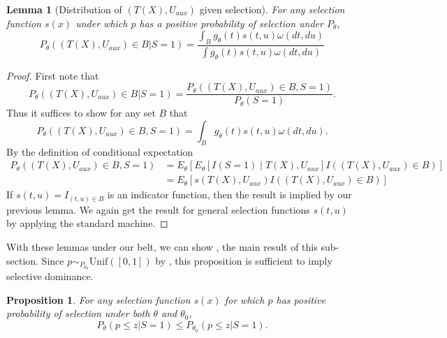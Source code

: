 \documentclass{article}
\newtheorem{lemma}{Lemma}
\newtheorem{proposition}{Proposition}
\begin{document}
\begin{appendix}
\begin{lemma}[Distribution of $(T(X), U_{aux})$ given selection]
    \label{lem:cond_dist}
    For any selection function $s(x)$ under which $p$ has a positive probability of selection under $P_{\theta}$, 
    \begin{equation*}
        P_{\theta}((T(X), U_{aux}) \in B| S = 1 ) = \frac{\int_{B} g_{\theta}(t)s(t, u) \omega(dt, du)}{ \int g_{\theta}(t) s(t, u) \omega(dt, du) }
    \end{equation*}
\end{lemma}

\begin{proof} First note that
    \begin{equation*}
        P_{\theta}( (T(X), U_{aux}) \in B | S= 1 ) = \frac{P_{\theta}((T(X), U_{aux}) \in B, S = 1) }{P_{\theta}(S = 1)}.
    \end{equation*} 
    Thus it suffices to show for any set $B$ that 
    \begin{equation*}
        P_{\theta}( (T(X), U_{aux}) \in B,  S= 1 ) = \int_B g_{\theta}(t) s(t, u) \omega(dt, du). 
    \end{equation*} 
    By the definition of conditional expectation
    \begin{align*}
        P_{\theta}( (T(X), U_{aux}) \in B,  S= 1 ) &= E_{\theta}[E_{\theta}[ I(S=1) \mid  T(X), U_{aux}] I((T(X), U_{aux}) \in B) ]\\
                                                   &= E_{\theta}[ s(T(X), U_{aux}) I((T(X), U_{aux}) \in B) ]
    \end{align*}
    If $s(t, u) = I_{(t, u) \in B}$ is an indicator function, then the result is implied by our previous lemma. We again get the result for general selection functions $s(t, u)$ by applying the standard machine. 
\end{proof}


With these lemmas under our belt, we can show , the main result of this sub-section. Since $p \sim_{P_{\theta_0}} \text{Unif}([0, 1])$ by , this proposition is sufficient to imply selective dominance. 

\begin{proposition}
    \label{prop:mlr_sel_dom}
    For any selection function $s(x)$ for which $p$ has positive probability of selection under both $\theta$ and $\theta_0$,  
    \begin{equation*}
        P_{\theta}(p \leq z | S = 1)  \leq P_{\theta_0}(p \leq z | S = 1).
    \end{equation*}
\end{proposition}


\end{appendix}
\end{document}
